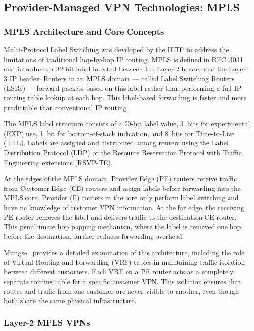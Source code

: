 \documentclass[conference]{IEEEtran}
\begin{document}
\subsection{Provider-Managed VPN Technologies: MPLS}

\subsubsection{MPLS Architecture and Core Concepts}

Multi-Protocol Label Switching was developed by the IETF to address
the limitations of traditional hop-by-hop IP routing. MPLS is
defined in RFC~3031~\cite{rfc3031} and introduces a 32-bit label
inserted between the Layer-2 header and the Layer-3 IP header.
Routers in an MPLS domain --- called Label Switching Routers (LSRs)
--- forward packets based on this label rather than performing a
full IP routing table lookup at each hop. This label-based
forwarding is faster and more predictable than conventional IP
routing.

The MPLS label structure consists of a 20-bit label value, 3~bits
for experimental (EXP) use, 1~bit for bottom-of-stack indication,
and 8~bits for Time-to-Live (TTL). Labels are assigned and
distributed among routers using the Label Distribution Protocol
(LDP) or the Resource Reservation Protocol with Traffic Engineering
extensions (RSVP-TE).

At the edges of the MPLS domain, Provider Edge (PE) routers
receive traffic from Customer Edge (CE) routers and assign labels
before forwarding into the MPLS core. Provider (P) routers in the
core only perform label switching and have no knowledge of customer
VPN information. At the far edge, the receiving PE router removes
the label and delivers traffic to the destination CE router. This
penultimate hop popping mechanism, where the label is removed one
hop before the destination, further reduces forwarding overhead.

Mungse~\cite{mungse2023} provides a detailed examination of this
architecture, including the role of Virtual Routing and Forwarding
(VRF) tables in maintaining traffic isolation between different
customers. Each VRF on a PE router acts as a completely separate
routing table for a specific customer VPN. This isolation ensures
that routes and traffic from one customer are never visible to
another, even though both share the same physical infrastructure.

\subsubsection{Layer-2 MPLS VPNs}
\end{document}
